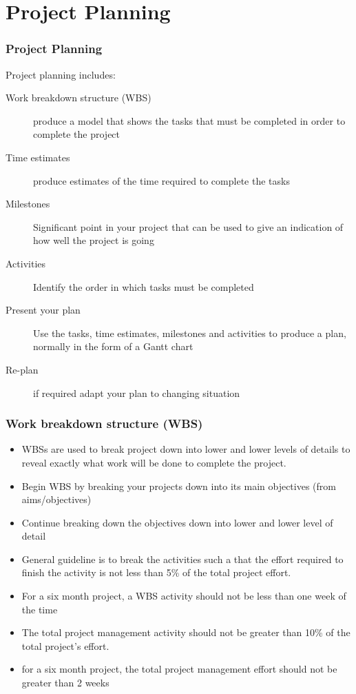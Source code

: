 \documentclass{beamer}
\begin{document}
\section{Project Planning} %
\label{sec:project_planning}
\begin{frame}[t]\frametitle{Project Planning}
Project planning includes:
\begin{description}
        \item [Work breakdown structure (WBS)] produce a model that shows the tasks that must be completed in order to complete the project
        \item [Time estimates] produce estimates of the time required to complete the tasks
        \item [Milestones] Significant point in your project that can be used to give an indication of how well the project is going
        \item [Activities] Identify the order in which tasks must be completed
        \item [Present your plan] Use the tasks, time estimates, milestones and activities to produce a plan, normally in the form of a Gantt chart
        \item [Re-plan] if required adapt your plan to changing situation
    \end{description}
\end{frame}


\begin{frame}[t]\frametitle{Work breakdown structure (WBS)}
\begin{itemize}
        \item WBSs are used to break project down into lower and lower levels of details to reveal exactly what work will be done to complete the project.
        \item Begin WBS by breaking your projects down into its main  objectives (from aims/objectives)
        \item Continue breaking down the objectives down into lower and lower level of detail
        \item General guideline is to break the activities such a that the effort required to finish the activity is not less than 5\% of the total project effort.
        \item For a six month project, a WBS activity should not be less than one week of the time
        \item The total project management activity should not be greater than 10\% of the total project's effort.
        \item for a six month project, the total project management effort should not be greater than 2 weeks
    \end{itemize}
\end{frame}
\end{document}
